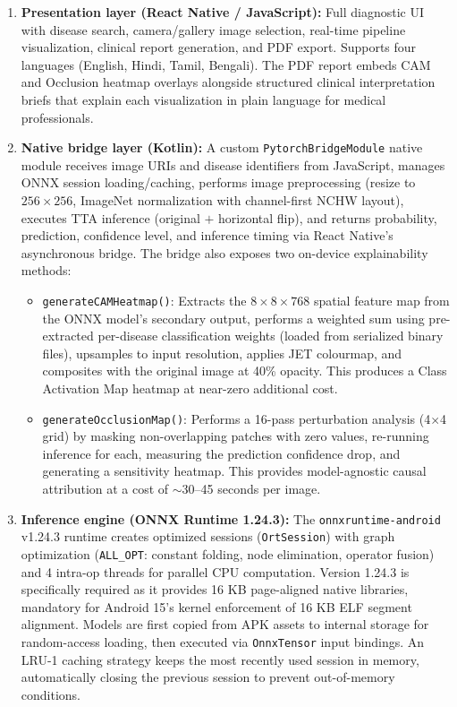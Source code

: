 \documentclass[12pt,a4paper]{report}
\begin{document}
\begin{enumerate}
    \item \textbf{Presentation layer (React Native / JavaScript):} Full diagnostic UI with disease search, camera/gallery image selection, real-time pipeline visualization, clinical report generation, and PDF export. Supports four languages (English, Hindi, Tamil, Bengali). The PDF report embeds CAM and Occlusion heatmap overlays alongside structured clinical interpretation briefs that explain each visualization in plain language for medical professionals.
    
    \item \textbf{Native bridge layer (Kotlin):} A custom \texttt{PytorchBridgeModule} native module receives image URIs and disease identifiers from JavaScript, manages ONNX session loading/caching, performs image preprocessing (resize to $256 \times 256$, ImageNet normalization with channel-first NCHW layout), executes TTA inference (original $+$ horizontal flip), and returns probability, prediction, confidence level, and inference timing via React Native's asynchronous bridge. The bridge also exposes two on-device explainability methods:
    \begin{itemize}
        \item \texttt{generateCAMHeatmap()}: Extracts the $8 \times 8 \times 768$ spatial feature map from the ONNX model's secondary output, performs a weighted sum using pre-extracted per-disease classification weights (loaded from serialized binary files), upsamples to input resolution, applies JET colourmap, and composites with the original image at 40\% opacity. This produces a Class Activation Map heatmap at near-zero additional cost.
        \item \texttt{generateOcclusionMap()}: Performs a 16-pass perturbation analysis (4$\times$4 grid) by masking non-overlapping patches with zero values, re-running inference for each, measuring the prediction confidence drop, and generating a sensitivity heatmap. This provides model-agnostic causal attribution at a cost of $\sim$30--45 seconds per image.
    \end{itemize}
    
    \item \textbf{Inference engine (ONNX Runtime 1.24.3):} The \texttt{onnxruntime-android} v1.24.3 runtime creates optimized sessions (\texttt{OrtSession}) with graph optimization (\texttt{ALL\_OPT}: constant folding, node elimination, operator fusion) and 4 intra-op threads for parallel CPU computation. Version 1.24.3 is specifically required as it provides 16 KB page-aligned native libraries, mandatory for Android 15's kernel enforcement of 16 KB ELF segment alignment. Models are first copied from APK assets to internal storage for random-access loading, then executed via \texttt{OnnxTensor} input bindings. An LRU-1 caching strategy keeps the most recently used session in memory, automatically closing the previous session to prevent out-of-memory conditions.
\end{enumerate}
\end{document}
